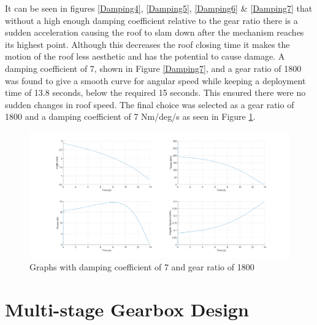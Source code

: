 \documentclass[a4paper]{article}
\begin{document}
It can be seen in figures \ref{Damping4}, \ref{Damping5}, \ref{Damping6}  \& \ref{Damping7} that without a high enough damping coefficient relative to the gear ratio there is a sudden acceleration causing the roof to slam down after the mechanism reaches its highest point. Although this decreases the roof closing time it makes the motion of the roof less aesthetic and has the potential to cause damage. A damping coefficient of 7, shown in Figure \ref{Damping7}, and a gear ratio of 1800 was found to give a smooth curve for angular speed while keeping a deployment time of 13.8 seconds, below the required 15 seconds. This ensured there were no sudden changes in roof speed. The final choice was selected as a gear ratio of 1800 and a damping coefficient of 7 Nm/deg/s as seen in Figure \ref{DFIN}. 

\begin{figure}[H]
\centering
\includegraphics[width=1\textwidth]{Final.png}
    \caption{\label{DFIN} Graphs with damping coefficient of 7 and gear ratio of 1800}
\end{figure}

\section{Multi-stage Gearbox Design}
\end{document}
